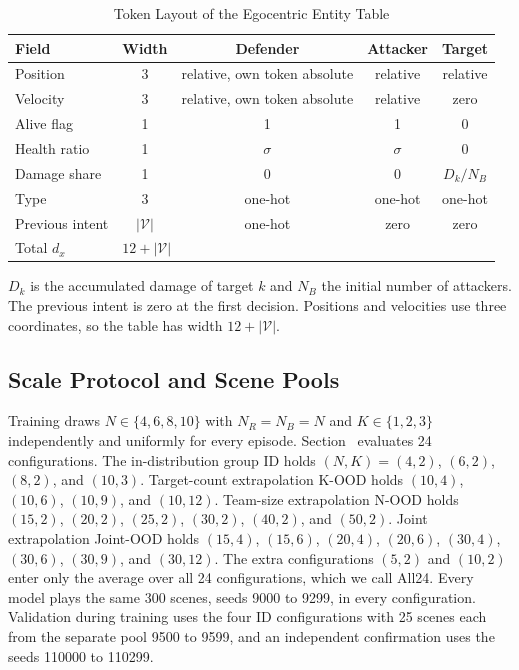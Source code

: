 \begin{table}[!t]
\centering
\scriptsize
\setlength{\tabcolsep}{3pt}
\caption{Token Layout of the Egocentric Entity Table}
\label{tab:s-token}
\begin{tabular}{@{}lcccc@{}}
\toprule
Field & Width & Defender & Attacker & Target\\
\midrule
Position & 3 & relative, own token absolute & relative & relative\\
Velocity & 3 & relative, own token absolute & relative & zero\\
Alive flag & 1 & 1 & 1 & 0\\
Health ratio & 1 & $\sigma$ & $\sigma$ & 0\\
Damage share & 1 & 0 & 0 & $D_k/N_B$\\
Type & 3 & one-hot & one-hot & one-hot\\
Previous intent & $|\mathcal V|$ & one-hot & zero & zero\\
\midrule
Total $d_x$ & \multicolumn{4}{l}{$12+|\mathcal V|$}\\
\bottomrule
\end{tabular}
\par\smallskip
\parbox{\columnwidth}{\scriptsize $D_k$ is the accumulated damage of target $k$ and $N_B$ the initial number of attackers. The previous intent is zero at the first decision. Positions and velocities use three coordinates, so the table has width $12+|\mathcal V|$.}
\end{table}

\subsection{Scale Protocol and Scene Pools}
Training draws $N\in\{4,6,8,10\}$ with $N_R=N_B=N$ and $K\in\{1,2,3\}$ independently and uniformly for every episode. Section~ evaluates 24 configurations. The in-distribution group ID holds $(N,K)=(4,2)$, $(6,2)$, $(8,2)$, and $(10,3)$. Target-count extrapolation K-OOD holds $(10,4)$, $(10,6)$, $(10,9)$, and $(10,12)$. Team-size extrapolation N-OOD holds $(15,2)$, $(20,2)$, $(25,2)$, $(30,2)$, $(40,2)$, and $(50,2)$. Joint extrapolation Joint-OOD holds $(15,4)$, $(15,6)$, $(20,4)$, $(20,6)$, $(30,4)$, $(30,6)$, $(30,9)$, and $(30,12)$. The extra configurations $(5,2)$ and $(10,2)$ enter only the average over all 24 configurations, which we call All24. Every model plays the same 300 scenes, seeds 9000 to 9299, in every configuration. Validation during training uses the four ID configurations with 25 scenes each from the separate pool 9500 to 9599, and an independent confirmation uses the seeds 110000 to 110299.

